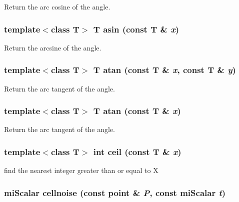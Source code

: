 Return the arc cosine of the angle. 

\subsubsection{\setlength{\rightskip}{0pt plus 5cm}template$<$class T$>$ T asin (const T \& {\em x})\hspace{0.3cm}{\tt  [inline]}}\label{namespacersl_a26}


Return the arcsine of the angle. 

\subsubsection{\setlength{\rightskip}{0pt plus 5cm}template$<$class T$>$ T atan (const T \& {\em x}, const T \& {\em y})\hspace{0.3cm}{\tt  [inline]}}\label{namespacersl_a29}


Return the arc tangent of the angle. 

\subsubsection{\setlength{\rightskip}{0pt plus 5cm}template$<$class T$>$ T atan (const T \& {\em x})\hspace{0.3cm}{\tt  [inline]}}\label{namespacersl_a28}


Return the arc tangent of the angle. 

\subsubsection{\setlength{\rightskip}{0pt plus 5cm}template$<$class T$>$ int ceil (const T \& {\em x})\hspace{0.3cm}{\tt  [inline]}}\label{namespacersl_a38}


find the nearest integer greater than or equal to X 

\subsubsection{\setlength{\rightskip}{0pt plus 5cm}mi\-Scalar cellnoise (const point \& {\em P}, const mi\-Scalar {\em t})\hspace{0.3cm}{\tt  [inline]}}\label{namespacersl_a130}


